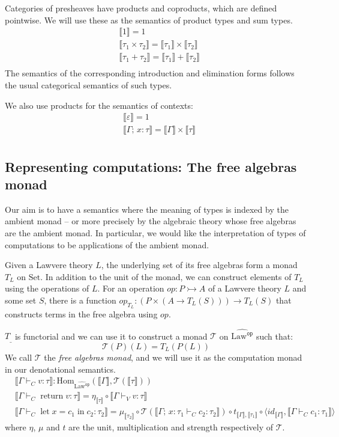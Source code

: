 \documentclass[acmsmall, screen, nonacm]{acmart}
\theoremstyle{definition}
\newcommand{\setc}{\mathrm{Set}}
\newcommand{\lawc}{\mathrm{Law}}
\newcommand{\lawcop}{\lawc^{\mathtt{op}}}
\newcommand{\pshlawcop}{\widehat{\lawcop}}
\newcommand{\homset}[3]{\mathrm{Hom}_{#1}(#2, #3)}
\newcommand{\sem}[1]{\llbracket #1 \rrbracket}
\newcommand{\mon}{\mathcal{T}}
\newcommand{\types}{\mathrel{:}}
\newcommand{\cempty}{\varepsilon}
\newcommand{\ccons}[2]{#1;\,#2}
\newcommand{\lbind}[3]{\ccons{#1}{#2\types#3}}
\newcommand{\return}[1]{\mathop{\mathrm{return}} #1}
\newcommand{\letv}[3]{\mathop{\mathrm{let}} #1 = #2 \mathop{\mathrm{in}} #3}
\newcommand{\turnv}{\mathrel{\vdash_V}}
\newcommand{\turnc}{\mathrel{\vdash_C}}
\begin{document}
Categories of presheaves have products and coproducts, which are defined
pointwise. We will use these as the semantics of product types and sum
types.
\begin{align*}
&\sem{1} = 1 \\
&\sem{\tau_1 \times \tau_2} = \sem{\tau_1} \times \sem{\tau_2} \\
&\sem{\tau_1 + \tau_2} = \sem{\tau_1} + \sem{\tau_2} \\
\end{align*}
The semantics of the corresponding introduction and elimination forms
follows the usual categorical semantics of such types.

We also use products for the semantics of contexts:
\begin{align*}
&\sem{\cempty} = 1 \\
&\sem{\lbind{\Gamma}{x}{\tau}} = \sem{\Gamma} \times \sem{\tau} \\
\end{align*}

\subsection{Representing computations: The free algebras monad}

Our aim is to have a semantics where the meaning of types is indexed by
the ambient monad -- or more precisely by the algebraic theory whose
free algebras are the ambient monad. In particular, we would like the
interpretation of types of computations to be applications of the
ambient monad.

Given a Lawvere theory $L$, the underlying set of its free algebras form
a monad $T_L$ on $\setc$. In addition to the unit of the monad, we can
construct elements of $T_L$ using the operations of $L$. For an
operation $op \types P \rightarrowtail A$ of a Lawvere theory $L$ and
some set $S$, there is a function
$op_{T_L} \types (P \times (A \rightarrow T_L(S))) \rightarrow T_L(S)$
that constructs terms in the free algebra using $op$.

$T_{\_}$ is functorial and we can use it to construct a monad $\mon$ on
$\pshlawcop$ such that:
\begin{equation*}
\mon(P)(L) = T_L(P(L))
\end{equation*}
We call $\mon$ the \emph{free algebras monad}, and we will use it as the
computation monad in our denotational semantics.
\begin{align*}
  &\sem{\Gamma \turnc v \types \tau} \mathrel{:}
    \homset{\pshlawcop}{\sem{\Gamma}}{\mon(\sem{\tau})} \\
  &\sem{\Gamma \turnc \return{v} \types \tau} =
    \eta_{\sem{\tau}} \circ \sem{\Gamma \turnv v \types \tau} \\
  &\sem{\Gamma \turnc \letv{x}{c_1}{c_2} \types \tau_2} =
    \mu_{\sem{\tau_2}}
    \circ \mon(\sem{\lbind{\Gamma}{x}{\tau_1} \turnc c_2 \types \tau_2})
    \circ t_{\sem{\Gamma}, \sem{\tau_1}}
    \circ \langle id_{\sem{\Gamma}}, \sem{\Gamma \turnc c_1 \types \tau_1} \rangle
\end{align*}
where $\eta$, $\mu$ and $t$ are the unit, multiplication and strength
respectively of $\mon$.
\end{document}
